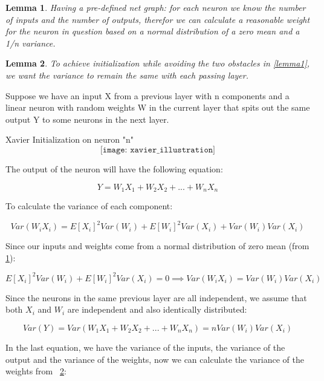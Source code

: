 \documentclass[12pt]{article}
\newtheorem{lemma}{Lemma}
\begin{document}
\begin{lemma}\label{lemma2}
Having a pre-defined net graph: for each neuron we know the number of inputs and the number of outputs, therefor we can calculate a reasonable weight for the neuron in question based on a normal distribution of a zero mean and a 1/n variance.
\end{lemma}
\begin{lemma}\label{lemma3}
To achieve initialization while avoiding the two obstacles in \cref{lemma1}, we want the variance to remain the same with each passing layer.	
\end{lemma}
\newpage
Suppose we have an input X from a previous layer with n components and a linear neuron with random weights W in the current layer that spits out the same output Y to some neurons in the next layer.
\begin{blockfigure}{Xavier Initialization on neuron "n"}
		\[ \texttt{[image: xavier\_illustration]} \]
\end{blockfigure}
The output of the neuron will have the following equation:
\begin{center}
	\begin{equation}
		Y = W_1X_1 + W_2X_2 + ... + W_n X_n \label{eq:1}
	\end{equation}
\end{center}
To calculate the variance of each component:
\begin{center}
	\begin{equation}
		Var(W_iX_i) = E[X_i]^2 Var(W_i) + E[W_i]^2 Var(X_i) + Var(W_i)Var(X_i) \label{eq:2}
	\end{equation}
\end{center}
Since our inputs and weights come from a normal distribution of zero mean (from \cref{lemma2}):
\begin{center}
	\begin{equation}
		E[X_i]^2 Var(W_i) + E[W_i]^2 Var(X_i) = 0 \implies
		Var(W_iX_i) = Var(W_i)Var(X_i) \label{eq:3}
	\end{equation}
\end{center}
Since the neurons in the same previous layer are all independent, we assume that both $ X_i $ and $ W_i $  are independent and also identically distributed:
\begin{center}
	\begin{equation}
	 Var(Y) = Var(W_1X_1 + W_2X_2 + ... + W_n X_n) = nVar(W_i)Var(X_i) \label{eq:4}
	\end{equation}
\end{center}
In the last equation, we have the variance of the inputs, the variance of the output and the variance of the weights, now we can calculate the variance of the weights from ~\cref{lemma3}:
\end{document}
